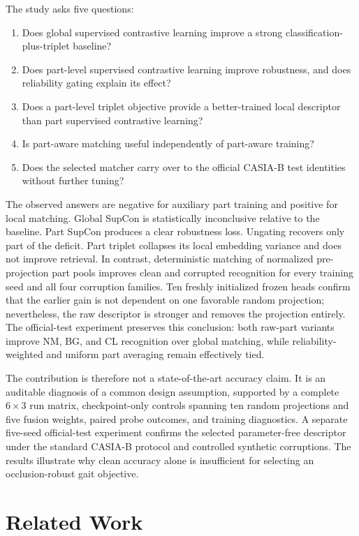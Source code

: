 \documentclass[runningheads]{llncs}
\begin{document}
The study asks five questions:
\begin{enumerate}
    \item Does global supervised contrastive learning improve a strong
    classification-plus-triplet baseline?
    \item Does part-level supervised contrastive learning improve robustness,
    and does reliability gating explain its effect?
    \item Does a part-level triplet objective provide a better-trained local
    descriptor than part supervised contrastive learning?
    \item Is part-aware matching useful independently of part-aware training?
    \item Does the selected matcher carry over to the official CASIA-B test
    identities without further tuning?
\end{enumerate}

The observed answers are negative for auxiliary part training and positive for
local matching. Global SupCon is statistically inconclusive relative to the
baseline. Part SupCon produces a clear robustness loss. Ungating recovers only
part of the deficit. Part triplet collapses its local embedding variance and
does not improve retrieval. In contrast, deterministic matching of normalized
pre-projection part pools improves clean and corrupted recognition for every
training seed and all four corruption families. Ten freshly initialized frozen
heads confirm that the earlier gain is not dependent on one favorable random
projection; nevertheless, the raw descriptor is stronger and removes the
projection entirely. The official-test experiment preserves this conclusion:
both raw-part variants improve NM, BG, and CL recognition over global matching,
while reliability-weighted and uniform part averaging remain effectively tied.

The contribution is therefore not a state-of-the-art accuracy claim. It is an
auditable diagnosis of a common design assumption, supported by a complete
$6\times3$ run matrix, checkpoint-only controls spanning ten random projections
and five fusion weights, paired probe outcomes, and training diagnostics. A
separate five-seed official-test experiment confirms the selected
parameter-free descriptor under the standard CASIA-B protocol and controlled
synthetic corruptions. The results illustrate why clean accuracy alone is
insufficient for selecting an occlusion-robust gait objective.

\section{Related Work}
\end{document}
